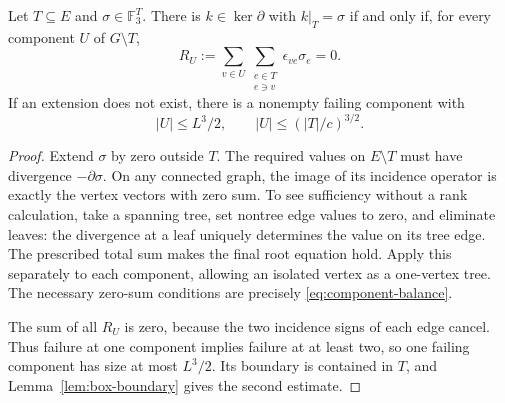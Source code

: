 \begin{lemma}
\label{lem:partial-flow}
Let \(T\subseteq E\) and \(\sigma\in\mathbb F_3^T\).  There is
\(k\in\ker\partial\) with \(k|_T=\sigma\) if and only if, for every component
\(U\) of \(G\setminus T\),
\begin{equation}
\label{eq:component-balance}
 R_U:=\sum_{v\in U}\sum_{\substack{e\in T\\e\ni v}}
                      \epsilon_{ve}\sigma_e=0.
\end{equation}
If an extension does not exist, there is a nonempty failing component
with
\[
 |U|\le L^3/2,\qquad |U|\le(|T|/c)^{3/2}.
\]
\end{lemma}
\begin{proof}
Extend \(\sigma\) by zero outside \(T\).  The required values on \(E\setminus
T\) must have divergence \(-\partial\sigma\).  On any connected graph, the
image of its incidence operator is exactly the vertex vectors with zero
sum.  To see sufficiency without a rank calculation, take a spanning tree,
set nontree edge values to zero, and eliminate leaves: the divergence at a
leaf uniquely determines the value on its tree edge.  The prescribed total
sum makes the final root equation hold.  Apply this separately to each
component, allowing an isolated vertex as a one-vertex tree.  The necessary
zero-sum conditions are precisely \eqref{eq:component-balance}.

The sum of all \(R_U\) is zero, because the two incidence signs of each edge
cancel.  Thus failure at one component implies failure at at least two, so
one failing component has size at most \(L^3/2\).  Its boundary is contained
in \(T\), and Lemma~\ref{lem:box-boundary} gives the second estimate.
\end{proof}

